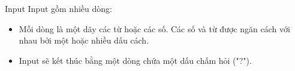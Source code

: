 Input
Input gồm nhiều dòng:  
\begin{itemize}
	\item     Mỗi dòng là một dãy các từ hoặc các số. Các số và từ được ngăn cách với nhau bởi một hoặc nhiều dấu cách.   
	\item     Input sẽ kết thúc bằng một dòng chứa một dấu chấm hỏi ("?").   
\end{itemize}